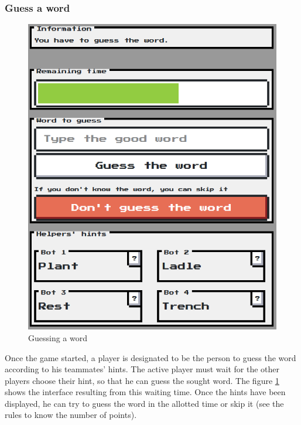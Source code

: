 \documentclass{tnreport}
\begin{document}
\bigskip

\subsubsection{Guess a word}

\begin{figure}
	\centering
	\vspace*{-0.5cm}
	\includegraphics[scale=0.4]{figures/guessing_word}
	\caption{Guessing a word}
	\label{fig:guessing_word}
	\vspace*{-0.5cm}
\end{figure}

Once the game started, a player is designated to be the person to guess the word according to his teammates' hints. The active player must wait for the other players choose their hint, so that he can guess the sought word. The figure \ref{fig:guessing_word} shows the interface resulting from this waiting time. Once the hints have been displayed, he can try to guess the word in the allotted time or skip it (see the rules to know the number of points). 
\end{document}
